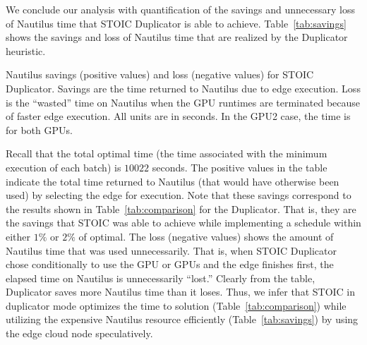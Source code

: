 We conclude our analysis with quantification of the savings and unnecessary loss of Nautilus time that STOIC Duplicator is able to achieve. Table~\ref{tab:savings} shows the savings and loss of Nautilus time that are realized by the Duplicator heuristic.

%
%

\begin{table}[t] 
\centering
\resizebox{300pt}{!}{

}
\caption{
Nautilus savings (positive values) and loss (negative values) for STOIC Duplicator. Savings are the time returned to Nautilus due to edge execution. Loss is the ``wasted'' time on Nautilus when the GPU runtimes are terminated because of faster edge execution. All units are in seconds. In the GPU2 case, the time is for both GPUs.}
\label{tab:savings}
\end{table}

Recall that the total optimal time (the time associated with the minimum execution of each batch) is $10022$ seconds. The positive values in the table indicate the total time returned to Nautilus (that would have otherwise been used) by selecting the edge for execution.  Note that these savings correspond to the results shown in Table~\ref{tab:comparison} for the Duplicator. That is, they are the savings that STOIC was able to achieve while implementing a schedule within either $1\%$ or $2\%$ of optimal.  The loss (negative values) shows the amount of Nautilus time that was used unnecessarily. That is, when STOIC Duplicator chose conditionally to use the GPU or GPUs and the edge finishes first, the elapsed time on Nautilus is unnecessarily ``lost.'' Clearly from the table, Duplicator saves more Nautilus time than it loses. Thus, we infer that STOIC in duplicator mode optimizes the time to solution (Table~\ref{tab:comparison}) while utilizing the expensive Nautilus resource efficiently (Table~\ref{tab:savings}) by using the edge cloud node speculatively.  


